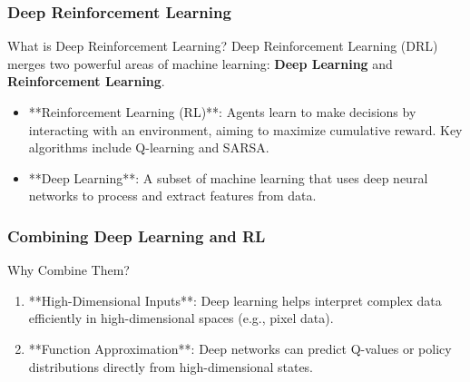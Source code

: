 \documentclass[aspectratio=169]{beamer}
\begin{document}
\begin{frame}[fragile]
    \frametitle{Deep Reinforcement Learning}
    \begin{block}{What is Deep Reinforcement Learning?}
        Deep Reinforcement Learning (DRL) merges two powerful areas of machine learning: 
        \textbf{Deep Learning} and \textbf{Reinforcement Learning}.
    \end{block}
    \begin{itemize}
        \item **Reinforcement Learning (RL)**: Agents learn to make decisions by interacting with an environment, aiming to maximize cumulative reward. Key algorithms include Q-learning and SARSA.
        \item **Deep Learning**: A subset of machine learning that uses deep neural networks to process and extract features from data.
    \end{itemize}
\end{frame}

\begin{frame}[fragile]
    \frametitle{Combining Deep Learning and RL}
    \begin{block}{Why Combine Them?}
        \begin{enumerate}
            \item **High-Dimensional Inputs**: Deep learning helps interpret complex data efficiently in high-dimensional spaces (e.g., pixel data).
            \item **Function Approximation**: Deep networks can predict Q-values or policy distributions directly from high-dimensional states.
        \end{enumerate}
    \end{block}
\end{frame}
\end{document}
